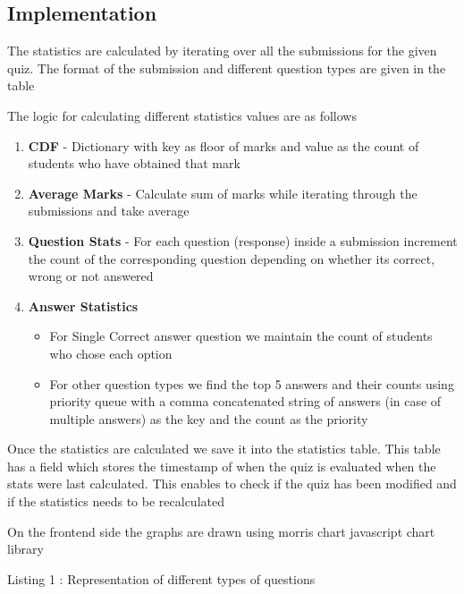 \subsection{Implementation}
	The statistics are calculated by iterating over all the submissions for the given quiz. The format of the submission and different question types are given in the table

	The logic for calculating different statistics values are as follows

    \begin{enumerate}    
        \item  \textbf{CDF} - Dictionary with key as floor of marks and value as the count of students who have obtained that mark
	    \item  \textbf{Average Marks} - Calculate sum of marks while iterating through the submissions and take average
	    \item  \textbf{Question Stats} - For each question (response) inside a submission increment the count of the corresponding question depending on whether its correct, wrong or not answered	
	    \item  \textbf{Answer Statistics}
	    \begin{itemize}
	        \item For Single Correct answer question we maintain the count of students who chose each option
		    \item For other question types we find the top 5 answers and their counts using priority queue with a comma concatenated string of answers (in case of multiple answers) as the key and the count as the priority
		\end{itemize}
	\end{enumerate}

	Once the statistics are calculated we save it into the statistics table. This table has a field which stores the timestamp of when the quiz is evaluated when the stats were last calculated. This enables to check if the quiz has been modified and if the statistics needs to be recalculated
	
	On the frontend side the graphs are drawn using morris chart javascript chart library

    \begin{center}
    Listing 1 : Representation of different types of questions
    \end{center}
	
    \inputminted{json}{code/question-type.json}

